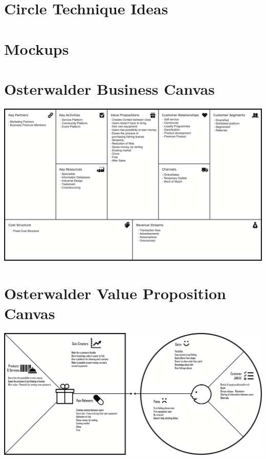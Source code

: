 

\begin{appendices}
  \renewcommand\thetable{\thesection}
  \renewcommand\thefigure{\thesection}

	\section{Circle Technique Ideas} \label{app:circ}
		
		\newpage
	
%		
		
	\section{Mockups} \label{app:mockups}
		
		\newpage
		
	\section{Osterwalder Business Canvas} \label{app:bcanvas}
	\includegraphics[width=.95\textwidth]{images/business_canvas}
	\newpage

	\section{Osterwalder Value Proposition Canvas} \label{app:vpcanvas}
	\includegraphics[width=.95\textwidth]{images/value_proposition_canvas}
	\newpage
	

\end{appendices}
